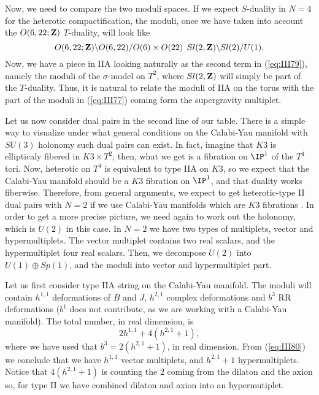 Now, we need to compare the two moduli spaces. If we expect
$S$-duality in $N\!=\!4$ for the heterotic compactification, the
moduli, once we have taken into account the $O(6,22;{\bf Z})$
$T$-duality, will look like
\begin{equation}
O(6,22;{\bf Z}) \backslash O(6,22) / O(6) \times O(22) \: \:
Sl(2,{\bf Z}) \backslash Sl(2) /U(1).
\label{eq:III79}
\end{equation}
Now, we have a piece in IIA looking naturally as the second term
in (\ref{eq:III79}), namely the moduli of the $\sigma$-model on
$T^2$, where $Sl(2,{\bf Z})$ will simply be part of the
$T$-duality. Thus, it is natural to relate the moduli of IIA on
the torus with the part of the moduli in (\ref{eq:III77}) coming
form the supergravity multiplet.
  
Let us now consider dual pairs in the second line of our table. 
There is a simple way to visualize under what
general conditions on the Calabi-Yau manifold with $SU(3)$
holonomy such dual pairs can exist. In fact, imagine that $K3$ is
ellipticaly fibered in $K3 \times T^2$; then, what we get is a
fibration on $\IP^1$ of the $T^4$ tori. Now, heterotic on $T^4$
is equivalent to type IIA on $K3$, so we expect that the
Calabi-Yau manifold should be a $K3$ fibration on $\IP^1$,
and that duality works fiberwise. Therefore, from general
arguments, we expect to get heterotic-type II dual pairs with
$N=2$ if we use Calabi-Yau manifolds which are $K3$ fibrations \cite{KaV,Klemm}.
In order to get a more precise picture, we need again to work out
the holonomy, which is $U(2)$ in this case. In $N=2$ we have two types 
of multiplets, vector and hypermultiplets. The vector multiplet
contains two real scalars, and the hypermultiplet four real
scalars. Then, we decompose $U(2)$ into $U(1)\oplus Sp(1)$, and
the moduli into vector and hypermultiplet part.
  
Let us first consider type IIA string on the Calabi-Yau manifold.
The moduli will contain $h^{1,1}$ deformations of $B$ and $J$,
$h^{2,1}$ complex deformations and $b^3$ RR deformations ($b^1$
does not contribute, as we are working with a Calabi-Yau
manifold). The total number, in real dimension, is
\begin{equation}
2h^{1,1}+4(h^{2,1}+1),
\label{eq:III80}
\end{equation}
where we have used that $b^3=2(h^{2,1}+1)$, in real dimension.
From (\ref{eq:III80}) we conclude that we have $h^{1,1}$ vector
multiplets, and $h^{2,1}+1$ hypermultiplets. Notice that
$4(h^{2,1}+1)$ is counting the $2$ coming from the dilaton and
the axion so, for type II we have combined dilaton and axion into
an hypermutiplet. 
  
